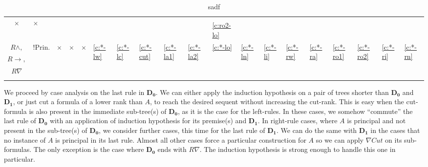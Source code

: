 \documentclass[a4paper, 12pt]{paper}
\newcommand{\caseref}[1]{\hyperref[#1]{\ref{#1}}}
\newcommand{\rot}{\rotatebox{90}}
\begin{document}
\begin{table}
\begin{tabular}{|c|p{.2cm}|*{17}{p{.4cm}|}}
		\multirow{2}{*}{$\times$} &
		\multirow{2}{*}{$\times$} \\
		$R \lor_2,$ & & & & & & & & & & \caseref{c:ro2-lo} & & & & & & & &\\
		\cline{2-19}
		$R \land,$ & \multirow{3}{*}{\tiny !Prin.} &
		\multirow{3}{*}{$\times$} &
		\multirow{3}{*}{$\times$} &
		\multirow{3}{*}{$\times$} &
		\multirow{3}{*}{\caseref{c:*-lw}} &
		\multirow{3}{*}{\caseref{c:*-lc}} &
		\multirow{3}{*}{\caseref{c:*-cut}} &
		\multirow{3}{*}{\caseref{c:*-la1}} &
		\multirow{3}{*}{\caseref{c:*-la2}} &
		\multirow{3}{*}{\caseref{c:*-lo}} &
		\multirow{3}{*}{\caseref{c:*-ln}} &
		\multirow{3}{*}{\caseref{c:*-li}} &
		\multirow{3}{*}{\caseref{c:*-rw}} &
		\multirow{3}{*}{\caseref{c:*-ra}} &
		\multirow{3}{*}{\caseref{c:*-ro1}} &
		\multirow{3}{*}{\caseref{c:*-ro2}} &
		\multirow{3}{*}{\caseref{c:*-ri}} &
		\multirow{3}{*}{\caseref{c:*-rn}} \\
		$R \rightarrow,$ & & & & & & & & & & & & & & & & & & \\
		$R \nabla$ & & & & & & & & & & & & & & & & & & \\
		\hline
		\multicolumn{2}{|c|}{\slashbox[2.3cm]{$\mathbf{D_0}$}{$\mathbf{D_1}$}} & \rot{$Id$} & \rot{$Ta$} & \rot{$Ex$} & \rot{$Lw$} & \rot{$Lc$} & \rot{$\nabla Cut$} & \rot{$L \land_1$} & \rot{$L \land_2$} & \rot{$L \lor$} & \rot{$L \nabla$} & \rot{$L \rightarrow$} & \rot{$Rw$} & \rot{$R \land$} & \rot{$R \lor_1$} & \rot{$R \lor_2$} & \rot{$R \rightarrow$} & \rot{$R \nabla$} \\
		\hline
	\end{tabular}
	\caption{sadf}
\end{table}


We proceed by case analysis on the last rule in $\mathbf{D_0}$. We can either apply the induction hypothesis on a pair of trees shorter than $\mathbf{D_0}$ and $\mathbf{D_1}$, or just cut a formula of a lower rank than $A$, to reach the desired sequent without increasing the cut-rank. This is easy when the cut-formula is also present in the immediate sub-tree(s) of $\mathbf{D_0}$, as it is the case for the left-rules. In these cases, we somehow ``commute'' the last rule of $\mathbf{D_0}$ with an application of induction hypothesis for its premise(s) and $\mathbf{D_1}$. In right-rule cases, where $A$ is principal and not present in the sub-tree(s) of $\mathbf{D_0}$, we consider further cases, this time for the last rule of $\mathbf{D_1}$. We can do the same with $\mathbf{D_1}$ in the cases that no instance of $A$ is principal in its last rule. Almost all other cases force a particular construction for $A$ so we can apply $\nabla Cut$ on its sub-formulas. The only exception is the case where $\mathbf{D_0}$ ends with $R \nabla$. The induction hypothesis is strong enough to handle this one in particular.
\end{document}
